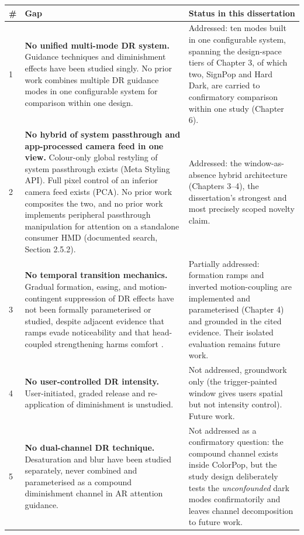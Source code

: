 \begin{longtable}{|p{}|p{}|p{}|}
\hline
\textbf{\#} & \textbf{Gap} & \textbf{Status in this dissertation} \\
\hline
\endhead
1 & \textbf{No unified multi-mode DR system.} Guidance techniques and diminishment effects have been studied singly. No prior work combines multiple DR guidance modes in one configurable system for comparison within one design. & Addressed: ten modes built in one configurable system, spanning the design-space tiers of Chapter 3, of which two, SignPop and Hard Dark, are carried to confirmatory comparison within one study (Chapter 6). \\
\hline
2 & \textbf{No hybrid of system passthrough and app-processed camera feed in one view.} Colour-only global restyling of system passthrough exists (Meta Styling API). Full pixel control of an inferior camera feed exists (PCA). No prior work composites the two, and no prior work implements peripheral passthrough manipulation for attention on a standalone consumer HMD (documented search, Section 2.5.2). & Addressed: the window-as-absence hybrid architecture (Chapters 3–4), the dissertation's strongest and most precisely scoped novelty claim. \\
\hline
3 & \textbf{No temporal transition mechanics.} Gradual formation, easing, and motion-contingent suppression of DR effects have not been formally parameterised or studied, despite adjacent evidence that ramps evade noticeability \citep{hata2016} and that head-coupled strengthening harms comfort \citep{norouzi2018}. & Partially addressed: formation ramps and inverted motion-coupling are implemented and parameterised (Chapter 4) and grounded in the cited evidence. Their isolated evaluation remains future work. \\
\hline
4 & \textbf{No user-controlled DR intensity.} User-initiated, graded release and re-application of diminishment is unstudied. & Not addressed, groundwork only (the trigger-painted window gives users spatial but not intensity control). Future work. \\
\hline
5 & \textbf{No dual-channel DR technique.} Desaturation and blur have been studied separately, never combined and parameterised as a compound diminishment channel in AR attention guidance. & Not addressed as a confirmatory question: the compound channel exists inside ColorPop, but the study design deliberately tests the \textit{unconfounded} dark modes confirmatorily and leaves channel decomposition to future work. \\
\hline
\end{longtable}

